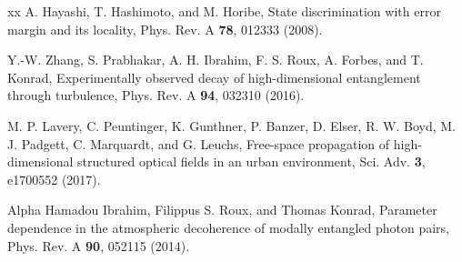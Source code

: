 \documentclass[letterpaper,preprint,superscriptaddress,floatfix,showpacs]{revtex4}
\begin{document}
\begin{thebibliography}{xx}
 A. Hayashi, T. Hashimoto, and M. Horibe, State discrimination with error margin and its locality, Phys. Rev. A {\bf 78}, 012333 (2008).







 Y.-W. Zhang, S. Prabhakar, A. H. Ibrahim, F. S. Roux, A. Forbes, and T. Konrad, Experimentally observed decay of high-dimensional entanglement through turbulence, Phys. Rev. A {\bf 94}, 032310 (2016).



 M. P. Lavery, C. Peuntinger, K. Gunthner, P. Banzer, D. Elser, R. W. Boyd, M. J. Padgett, C. Marquardt, and G. Leuchs, Free-space propagation of high-dimensional structured optical fields in an urban environment, Sci. Adv. {\bf 3}, e1700552 (2017).

 Alpha Hamadou Ibrahim, Filippus S. Roux, and Thomas Konrad, Parameter dependence in the atmospheric decoherence of modally entangled photon pairs, Phys. Rev. A {\bf 90}, 052115 (2014).












\end{thebibliography}
\end{document}
